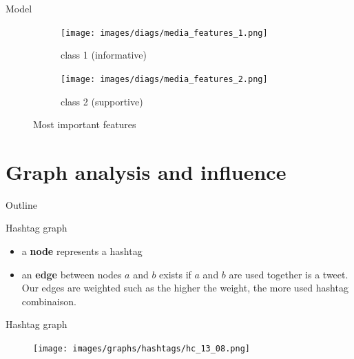 \documentclass[first=dblue,second=red,logo=blueexc]{aaltoslides}
\begin{document}

\begin{frame}{Model}
\begin{figure}[H]
\begin{subfigure}[t]{0.5\textwidth}
\begin{center}
	\texttt{[image: images/diags/media\_features\_1.png]}
	\caption{class 1 (informative)}
	\label{impfeatureclass1}
\end{center}
\end{subfigure}
\begin{subfigure}[t]{0.42\textwidth}
\begin{center}
	\texttt{[image: images/diags/media\_features\_2.png]}
	\caption{class 2 (supportive)}
	\label{impfeatureclass2}
\end{center}
\end{subfigure}
\caption{Most important features}
\end{figure}
\end{frame}


\section{Graph analysis and influence}
\begin{frame}{Outline}
\tableofcontents[sectionstyle=show/shaded]
\end{frame}

\begin{frame}{Hashtag graph}
\begin{itemize}
\item a \textbf{node} represents a hashtag
\item an \textbf{edge} between nodes $a$ and $b$ exists if $a$ and $b$ are used together is a tweet. Our edges are weighted such as the higher the weight, the more used hashtag combinaison.
\end{itemize}

\end{frame}


\begin{frame}{Hashtag graph}
\begin{figure}[H]
\centering
\texttt{[image: images/graphs/hashtags/hc\_13\_08.png]}
\label{graphHt13c}
\end{figure}
\end{frame}
\end{document}
